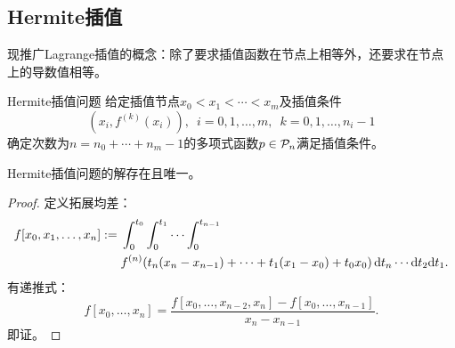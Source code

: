 \subsection{Hermite插值}

现推广Lagrange插值的概念：除了要求插值函数在节点上相等外，还要求在节点上的导数值相等。

\begin{definition}
    {Hermite插值问题}{}
    给定插值节点$x_0<x_1<\cdots<x_m$及插值条件
    \[
        (x_i,f^{(k)}(x_i)),\enspace i=0,1,\ldots,m,\enspace k=0,1,\ldots,n_i-1
    \]
    确定次数为$n=n_0+\cdots+n_m-1$的多项式函数$p\in\mathcal P_n$满足插值条件。
\end{definition}

\begin{theorem}
    {}{}
    Hermite插值问题的解存在且唯一。
\end{theorem}

\begin{proof}
    定义拓展均差：
    \begin{equation}
        \begin{aligned}
            f[x_0,x_1,\ldots,x_n]:={}&\int_0^{t_0}\int_0^{t_1}\cdots\int_0^{t_{n-1}}\\
            &f^{(n)}(t_n(x_n-x_{n-1})+\cdots+t_1(x_1-x_0)+t_0x_0)\mathop{}\!\mathrm{d} t_n\cdots\mathrm{d} t_2\mathrm{d} t_1.
        \end{aligned}
    \end{equation}
    有递推式：
    \begin{equation}
        f[x_0,\ldots,x_n]=\frac{f[x_0,\ldots,x_{n-2},x_n]-f[x_0,\ldots,x_{n-1}]}{x_n-x_{n-1}}.
    \end{equation}
    即证。
\end{proof}


